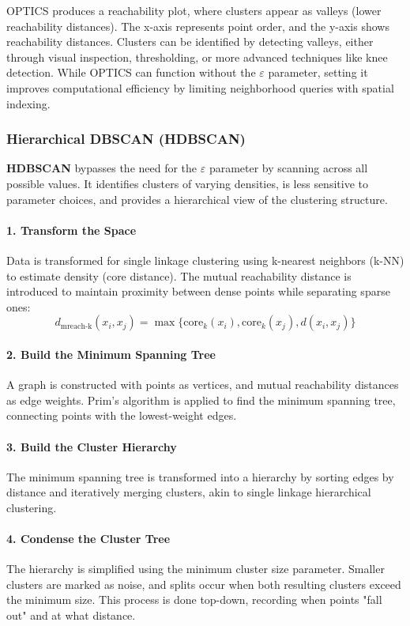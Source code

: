 OPTICS produces a reachability plot, where clusters appear as valleys (lower reachability distances). The x-axis represents point order, and the y-axis shows reachability distances. Clusters can be identified by detecting valleys, either through visual inspection, thresholding, or more advanced techniques like knee detection. While OPTICS can function without the $\varepsilon$ parameter, setting it improves computational efficiency by limiting neighborhood queries with spatial indexing.
\subsubsection{Hierarchical DBSCAN (HDBSCAN)}
\textbf{HDBSCAN} bypasses the need for the $\varepsilon$ parameter by scanning across all possible values. It identifies clusters of varying densities, is less sensitive to parameter choices, and provides a hierarchical view of the clustering structure.

\paragraph{1. Transform the Space}
Data is transformed for single linkage clustering using k-nearest neighbors (k-NN) to estimate density (core distance). The mutual reachability distance is introduced to maintain proximity between dense points while separating sparse ones:
\begin{equation}
d_{\text{mreach-k}}(x_i, x_j) = \max\{\text{core}_k(x_i), \text{core}_k(x_j), d(x_i, x_j)\}
\end{equation}

\paragraph{2. Build the Minimum Spanning Tree}
A graph is constructed with points as vertices, and mutual reachability distances as edge weights. Prim's algorithm is applied to find the minimum spanning tree, connecting points with the lowest-weight edges.

\paragraph{3. Build the Cluster Hierarchy}
The minimum spanning tree is transformed into a hierarchy by sorting edges by distance and iteratively merging clusters, akin to single linkage hierarchical clustering.

\paragraph{4. Condense the Cluster Tree}
The hierarchy is simplified using the minimum cluster size parameter. Smaller clusters are marked as noise, and splits occur when both resulting clusters exceed the minimum size. This process is done top-down, recording when points "fall out" and at what distance.


